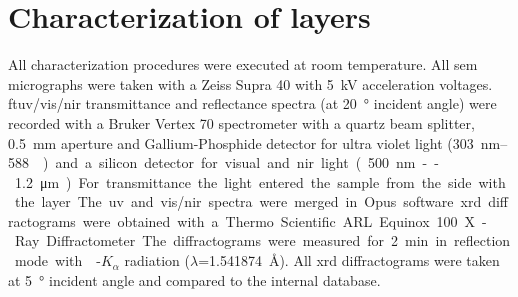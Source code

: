 \section{Characterization of  layers}
All characterization procedures were executed at room temperature.
All \gls{sem} micrographs were taken with a Zeiss Supra 40 with  \SI{5}{\kilo\volt} acceleration voltages.
\Gls{ft}\gls{uv}/\gls{vis}/\gls{nir} transmittance and reflectance spectra (at \SI{20}{\degree} incident 
angle) were recorded with a Bruker Vertex 70 
spectrometer with a quartz beam splitter, \SI{0.5}{\milli\meter} aperture and 
Gallium-Phosphide detector for ultra violet light (\SI{303}{\nano\meter}--\SI{588}
{\nano\meter}) and a silicon detector for visual and \gls{nir} light 
(\SI{500}{\nano\meter}--\SI{1.2}{\micro\meter}). For transmittance the light
entered the sample from the side with the layer. The \gls{uv} and \gls{vis}/\gls{nir} spectra were merged 
in Opus software. %
\Gls{xrd} diffractograms were obtained with a Thermo Scientific ARL Equinox 100 X-Ray Diffractometer.
The diffractograms were measured for \SI{2}{\minute} in reflection mode with -$K_{\alpha}$ radiation ($\lambda$=\SI{1.541874}{\angstrom}).
All \gls{xrd} diffractograms were taken at \SI{5}{\degree} incident angle and compared to the internal database.

